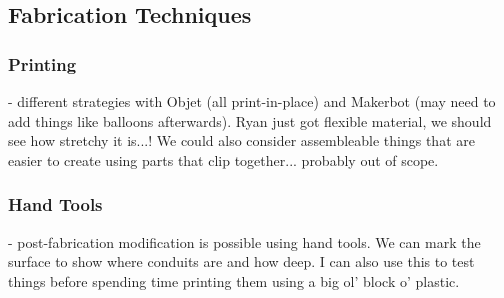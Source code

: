 \subsection{Fabrication Techniques}


\subsubsection{Printing} - different strategies with Objet (all print-in-place) and Makerbot (may need to add things like balloons afterwards).  Ryan just got flexible material, we should see how stretchy it is...!  We could also consider assembleable things that are easier to create using parts that clip together... probably out of scope.

\subsubsection{Hand Tools} - post-fabrication modification is possible using hand tools.  We can mark the surface to show where conduits are and how deep.  I can also use this to test things before spending time printing them using a big ol' block o' plastic.